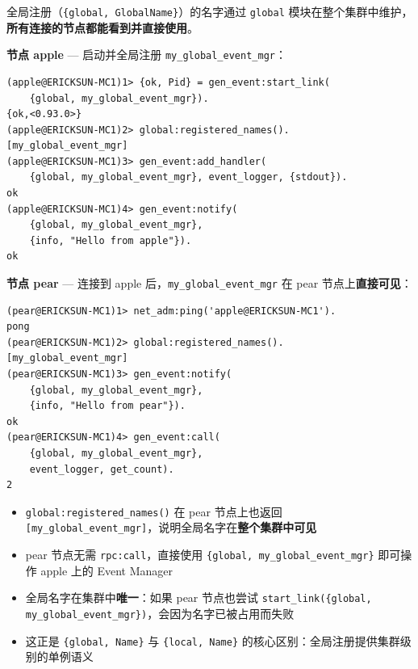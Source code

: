 \documentclass[a4paper,11pt]{article}
\begin{document}
全局注册（\texttt{\{global, GlobalName\}}）的名字通过 \texttt{global} 模块在整个集群中维护，\textbf{所有连接的节点都能看到并直接使用}。

\textbf{节点 apple} --- 启动并全局注册 \texttt{my\_global\_event\_mgr}：

\begin{lstlisting}[style=shellstyle, caption={apple 节点 --- 全局注册 Event Manager}]
(apple@ERICKSUN-MC1)1> {ok, Pid} = gen_event:start_link(
    {global, my_global_event_mgr}).
{ok,<0.93.0>}
(apple@ERICKSUN-MC1)2> global:registered_names().
[my_global_event_mgr]
(apple@ERICKSUN-MC1)3> gen_event:add_handler(
    {global, my_global_event_mgr}, event_logger, {stdout}).
ok
(apple@ERICKSUN-MC1)4> gen_event:notify(
    {global, my_global_event_mgr},
    {info, "Hello from apple"}).
ok
\end{lstlisting}

\textbf{节点 pear} --- 连接到 apple 后，\texttt{my\_global\_event\_mgr} 在 pear 节点上\textbf{直接可见}：

\begin{lstlisting}[style=shellstyle, caption={pear 节点 --- 直接通过全局名字访问}]
(pear@ERICKSUN-MC1)1> net_adm:ping('apple@ERICKSUN-MC1').
pong
(pear@ERICKSUN-MC1)2> global:registered_names().
[my_global_event_mgr]
(pear@ERICKSUN-MC1)3> gen_event:notify(
    {global, my_global_event_mgr},
    {info, "Hello from pear"}).
ok
(pear@ERICKSUN-MC1)4> gen_event:call(
    {global, my_global_event_mgr},
    event_logger, get_count).
2
\end{lstlisting}

\begin{tipbox}[全局注册的关键特性]
\begin{itemize}[leftmargin=1.5em]
    \item \texttt{global:registered\_names()} 在 pear 节点上也返回 \texttt{[my\_global\_event\_mgr]}，说明全局名字在\textbf{整个集群中可见}
    \item pear 节点无需 \texttt{rpc:call}，直接使用 \texttt{\{global, my\_global\_event\_mgr\}} 即可操作 apple 上的 Event Manager
    \item 全局名字在集群中\textbf{唯一}：如果 pear 节点也尝试 \texttt{start\_link(\{global, my\_global\_event\_mgr\})}，会因为名字已被占用而失败
    \item 这正是 \texttt{\{global, Name\}} 与 \texttt{\{local, Name\}} 的核心区别：全局注册提供集群级别的单例语义
\end{itemize}
\end{tipbox}
\end{document}
